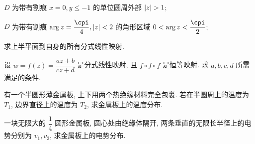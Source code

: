 \begin{homework}
\begin{homework}
\begin{subhomework}
      \item $D$ 为带有割痕 $x=0,y\le -1$ 的单位圆周外部 $\abs{z}>1$;
      \item $D$ 为带有割痕 $\arg z=\dfrac\cpi4, \abs{z}<2$ 的角形区域 $0<\arg z<\dfrac\cpi2$;
    \end{subhomework}
    \item 求上半平面到自身的所有分式线性映射.
    \item \optionalex 设 $w=f(z)=\dfrac{az+b}{cz+d}$ 是分式线性映射, 且 $f\circ f\circ f$ 是恒等映射. 求 $a,b,c,d$ 所需满足的条件.
    \item \optionalex 有一个半圆形薄金属板, 上下用两个热绝缘材料完全包裹. 若在半圆周上的温度为 $T_1$, 边界直径上的温度为 $T_2$, 求金属板上的温度分布.
    \item \optionalex 一块无限大的 $\dfrac14$ 圆形金属板, 圆心处由绝缘体隔开, 两条垂直的无限长半径上的电势分别为 $v_1,v_2$, 求金属板上的电势分布.
  \end{homework}
\end{homework}
\finishwidepage
  


